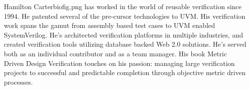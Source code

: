 \documentclass[twocolumn,letterpaper]{IEEEAerospaceCLS}  %
\begin{document}
\thebiography
\begin{biographywithpic}
{Hamilton Carter}{biofig.png}
has worked in
the world of reusable verification
since 1994. He patented several of
the pre-cursor technologies to UVM.
His verification work spans the
gamut from assembly based test
cases to UVM enabled
SystemVerilog. He’s architected
verification platforms in multiple industries, and created
verification tools utilizing database backed Web 2.0
solutions. He’s served both as an individual contributor
and as a team manager. His book Metric Driven Design
Verification touches on his passion: managing large
verification projects to successful and predictable
completion through objective metric driven processes.

\end{biographywithpic} 
\end{document}
